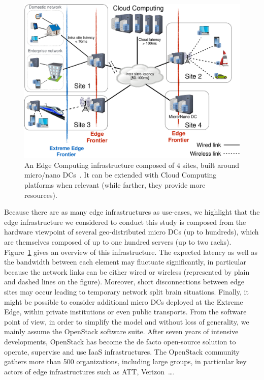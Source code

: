 \begin{figure}[t]
  \centering
  \includegraphics[width=\columnwidth]{./figures/figure_fog.pdf}
  \caption{An Edge Computing infrastructure composed of $4$ sites, built around
    micro/nano DCs~\cite{7923796}. It can be extended with Cloud Computing
    platforms when relevant (while farther, they provide more resources).}
  \label{fig:fogedge-archi}
\end{figure}

Because there are as many edge infrastructures as use-cases, we
highlight that the edge infrastructure we considered to conduct this
study is composed from the hardware viewpoint of several
geo-distributed micro DCs (up to hundreds), which are themselves
composed of up to one hundred servers (up to two racks).
Figure~\ref{fig:fogedge-archi} gives an overview of this
infrastructure. The expected latency as well as the bandwidth between
each element may fluctuate significantly, in particular because the
network links can be either wired or wireless (represented by plain
and dashed lines on the figure). Moreover, short disconnections
between edge sites may occur leading to temporary network split brain
situations.  Finally, it might be possible
to consider additional micro DCs deployed at the Extreme Edge, within
private institutions or even public transports.
%
From the software point of view, in order to simplify the model and
without loss of generality, we mainly assume the OpenStack software
suite.  After seven years of intensive developments, OpenStack has
become the de facto open-source solution to operate, supervise and use
IaaS infrastructures.  The OpenStack community gathers more than 500
organizations, including large groups, in particular key actors of
edge infrastructures such as ATT, Verizon~\ldots.


